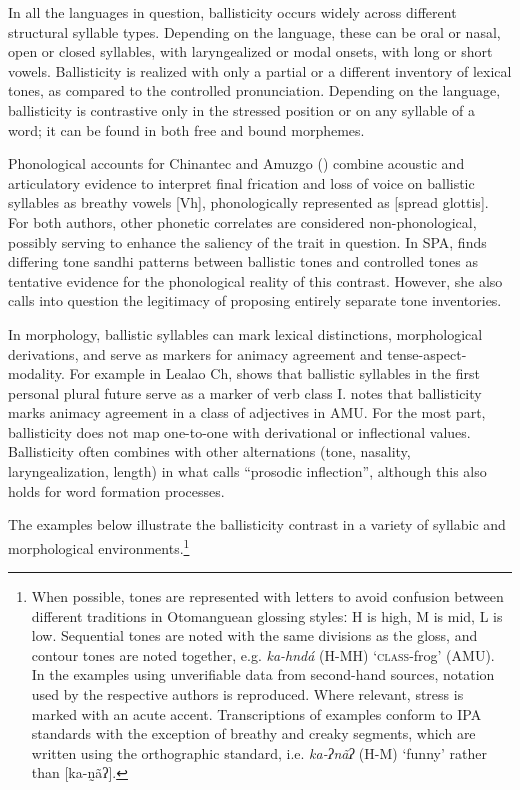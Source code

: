 \documentclass[output=paper]{langscibook}
\begin{document}
In all the languages in question, ballisticity occurs widely across different structural syllable types. Depending on the language, these can be oral or nasal, open or closed syllables, with laryngealized or modal onsets, with long or short vowels. Ballisticity is realized with only a partial or a different inventory of lexical tones, as compared to the controlled pronunciation. Depending on the language, ballisticity is contrastive only in the stressed position or on any syllable of a word; it can be found in both free and bound morphemes. 

Phonological accounts for Chinantec \citep{Silverman1994} and Amuzgo (\citealt{Zendejas2000}) combine acoustic and articulatory evidence to interpret final frication and loss of voice on ballistic syllables as breathy vowels [Vh], phonologically represented as [spread glottis]. For both authors, other phonetic correlates are considered non-phonological, possibly serving to enhance the saliency of the trait in question. In SPA, \citet{Kim2011} finds differing tone sandhi patterns between ballistic tones and controlled tones as tentative evidence for the phonological reality of this contrast. However, she also calls into question the legitimacy of proposing entirely separate tone inventories. 

In morphology, ballistic syllables can mark lexical distinctions, morphological derivations, and serve as markers for animacy agreement and tense-aspect-modality. For example in Lealao Ch, \citet{Palancar2015} shows that ballistic syllables in the first personal plural future serve as a marker of verb class I. \citet{Dobui2018} notes that ballisticity marks animacy agreement in a class of adjectives in AMU. For the most part, ballisticity does not map one-to-one with derivational or inflectional values. Ballisticity often combines with other alternations (tone, nasality, laryngealization, length) in what \citet{Palancar2015} calls “prosodic inflection”, although this also holds for word formation processes. 

The examples below illustrate the ballisticity contrast in a variety of syllabic and morphological environments.\footnote{When possible, tones are represented with letters to avoid confusion between different traditions in Otomanguean glossing stylesː H is high, M is mid, L is low. Sequential tones are noted with the same divisions as the gloss, and contour tones are noted together, e.g. \textit{ka-hndá} (H-MH) ‘\textsc{class}-frog’ (AMU). In the examples using unverifiable data from second-hand sources, notation used by the respective authors is reproduced. Where relevant, stress is marked with an acute accent. Transcriptions of examples conform to IPA standards with the exception of breathy and creaky segments, which are written using the orthographic standard, i.e. \textit{ka-ʔnãʔ} (H-M) ‘funny’ rather than [ka-n̰ãʔ].}
\end{document}
